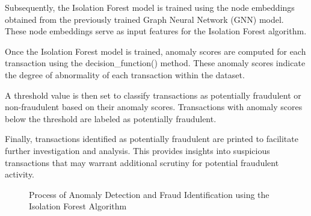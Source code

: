 Subsequently, the Isolation Forest model is trained using the node embeddings obtained from the previously trained Graph Neural Network (GNN) model. These node embeddings serve as input features for the Isolation Forest algorithm.

Once the Isolation Forest model is trained, anomaly scores are computed for each transaction using the decision\_function() method. These anomaly scores indicate the degree of abnormality of each transaction within the dataset.

A threshold value is then set to classify transactions as potentially fraudulent or non-fraudulent based on their anomaly scores. Transactions with anomaly scores below the threshold are labeled as potentially fraudulent.

Finally, transactions identified as potentially fraudulent are printed to facilitate further investigation and analysis. This provides insights into suspicious transactions that may warrant additional scrutiny for potential fraudulent activity.

\begin{figure}[htbp]
	\centering
	\caption{Process of Anomaly Detection and Fraud Identification using the Isolation Forest Algorithm}
	\label{fig:anomaly_detection}
\end{figure}